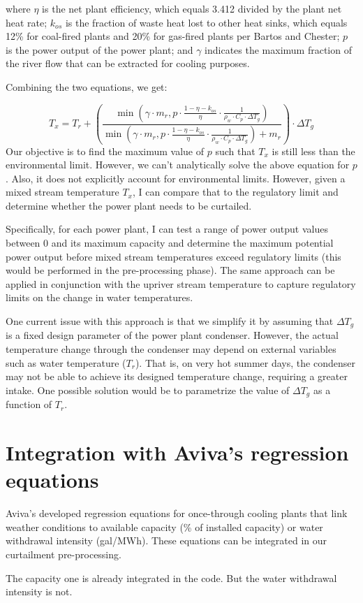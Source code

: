 \documentclass[11pt, oneside]{article}   	%
\begin{document}
where $\eta$ is the net plant efficiency, which equals 3.412 divided by the plant net heat rate; $k_{os}$ is the fraction of waste heat lost to other heat sinks, which equals 12\% for coal-fired plants and 20\% for gas-fired plants per Bartos and Chester; $p$ is the power output of the power plant; and $\gamma$ indicates the maximum fraction of the river flow that can be extracted for cooling purposes. 

Combining the two equations, we get:

\begin{equation} \label{eq:temp_mixed}
T_x = T_r + \left( \frac{ \min{\left (\gamma \cdot m_r, p \cdot \frac{1-\eta - k_{os}}{\eta} \cdot \frac{1}{\rho_w \cdot C_p \cdot \Delta T_{g}}\right)}}{ \min{\left (\gamma \cdot m_r, p \cdot \frac{1-\eta - k_{os}}{\eta} \cdot \frac{1}{\rho_w \cdot C_p \cdot \Delta T_{g}}\right)} + m_r}\right)\cdot \Delta T_g
\end{equation}
\rho
Our objective is to find the maximum value of $p$ such that $T_x$ is still less than the environmental limit. However, we can't analytically solve the above equation for $p$ . Also, it does not explicitly account for environmental limits. However, given a mixed stream temperature $T_x$, I can compare that to the regulatory limit and determine whether the power plant needs to be curtailed. 

Specifically, for each power plant, I can test a range of power output values between 0 and its maximum capacity and determine the maximum potential power output before mixed stream temperatures exceed regulatory limits (this would be performed in the pre-processing phase). The same approach can be applied in conjunction with the upriver stream temperature to capture regulatory limits on the change in water temperatures.

One current issue with this approach is that we simplify it by assuming that $\Delta T_g$ is a fixed design parameter of the power plant condenser. However, the actual temperature change through the  condenser may depend on external variables such as water temperature ($T_r$). That is, on very hot summer days, the condenser may not be able to achieve its designed temperature change, requiring a greater intake. One possible solution would be to parametrize the value of $\Delta T_g$ as a function of $T_r$. 

\section{Integration with Aviva's regression equations}

Aviva's developed regression equations for once-through cooling plants that link weather conditions to available capacity (\% of installed capacity) or water withdrawal intensity (gal/MWh). These equations can be integrated in our curtailment pre-processing.

The capacity one is already integrated in the code. But the water withdrawal intensity is not.
\end{document}
